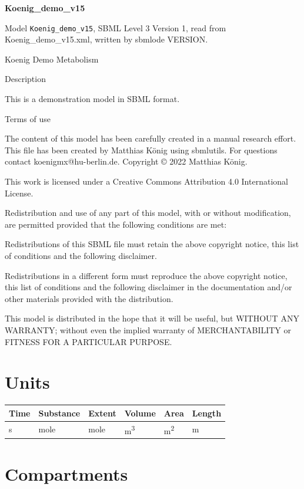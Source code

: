 \documentclass{article}
\begin{document}
{\centering\LARGE\bfseries Koenig\_\allowbreak{}demo\_\allowbreak{}v15\par}
\bigskip

Model \texttt{Koenig\_}\allowbreak{}\texttt{demo\_}\allowbreak{}\texttt{v15}, SBML Level 3 Version 1, read from Koenig\_\allowbreak{}demo\_\allowbreak{}v15.xml, written by sbmlode VERSION.

Koenig Demo Metabolism

Description

This is a demonstration model in SBML format.

Terms of use

The content of this model has been carefully created in a manual research effort. This file has been created by Matthias König using sbmlutils. For questions contact koenigmx@hu-berlin.de. Copyright © 2022 Matthias König.

This work is licensed under a Creative Commons Attribution 4.0 International License.

Redistribution and use of any part of this model, with or without modification, are permitted provided that the following conditions are met:

Redistributions of this SBML file must retain the above copyright notice, this list of conditions and the following disclaimer.

Redistributions in a different form must reproduce the above copyright notice, this list of conditions and the following disclaimer in the documentation and/or other materials provided with the distribution.

This model is distributed in the hope that it will be useful, but WITHOUT ANY WARRANTY; without even the implied warranty of MERCHANTABILITY or FITNESS FOR A PARTICULAR PURPOSE.

\section{Units}

\begin{tabular}{@{}llllll@{}}
  \toprule
  \textbf{Time} & \textbf{Substance} & \textbf{Extent} & \textbf{Volume} & \textbf{Area} & \textbf{Length} \\
  \midrule
  s & mole & mole & m\textsuperscript{3} & m\textsuperscript{2} & m \\
  \bottomrule
\end{tabular}

\section{Compartments}
\end{document}
